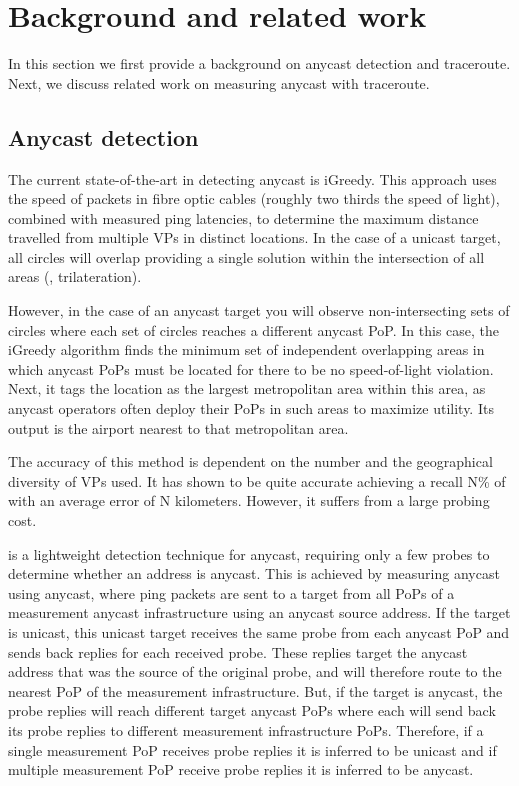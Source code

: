 
\section{Background and related work}\label{background}
In this section we first provide a background on anycast detection and traceroute.
Next, we discuss related work on measuring anycast with traceroute.
\subsection{Anycast detection}
The current state-of-the-art in detecting anycast is iGreedy.
This approach uses the speed of packets in fibre optic cables (roughly two thirds the speed of light), combined with measured ping latencies, to determine the maximum distance travelled from multiple VPs in distinct locations.
In the case of a unicast target, all circles will overlap providing a single solution within the intersection of all areas (\ie, trilateration).

However, in the case of an anycast target you will observe non-intersecting sets of circles where each set of circles reaches a different anycast PoP.
In this case, the iGreedy algorithm finds the minimum set of independent overlapping areas in which anycast PoPs must be located for there to be no speed-of-light violation.
Next, it tags the location as the largest metropolitan area within this area, as anycast operators often deploy their PoPs in such areas to maximize utility.
Its output is the airport nearest to that metropolitan area.

The accuracy of this method  %
is dependent on the number and the geographical diversity of VPs used.
It has shown to be quite accurate achieving a recall  N\% of with an average error of N kilometers.
However, it suffers from a large probing cost.

\manycasttwo is a lightweight detection technique for anycast, requiring only a few probes to determine whether an address is anycast.
This is achieved by measuring anycast using anycast, where ping packets are sent to a target from all PoPs of a measurement anycast infrastructure using an anycast source address.
If the target is unicast, this unicast target receives the same probe from each anycast PoP and sends back replies for each received probe.
These replies target the anycast address that was the source of the original probe, and will therefore route to the nearest PoP of the measurement infrastructure.
But, if the target is anycast, the probe replies will reach different target anycast PoPs where each will send back its probe replies to different measurement infrastructure PoPs.
Therefore, if a single measurement PoP receives probe replies it is inferred to be unicast and if multiple measurement PoP receive probe replies it is inferred to be anycast.

